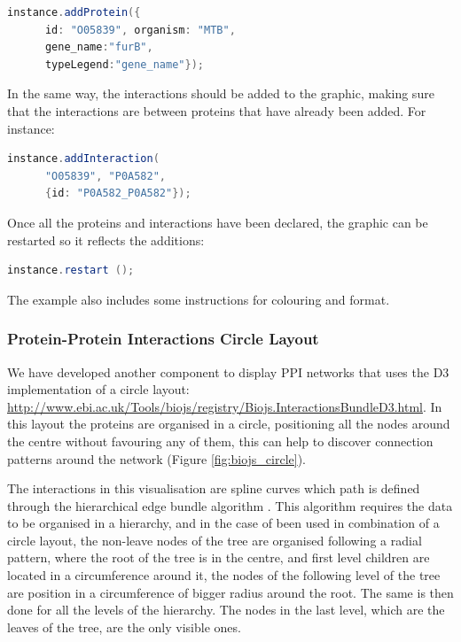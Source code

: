 \begin{lstlisting}[language=java]
instance.addProtein({
      id: "O05839", organism: "MTB",
      gene_name:"furB",
      typeLegend:"gene_name"});
\end{lstlisting}
					
In the same way, the interactions should be added to the graphic, making sure that the interactions are between proteins that have already been added. For instance:

\begin{lstlisting}[language=java]
instance.addInteraction(
      "O05839", "P0A582",
      {id: "P0A582_P0A582"}); 
\end{lstlisting}
					
Once all the proteins and interactions have been declared, the graphic can be restarted so it reflects the additions:

\begin{lstlisting}[language=java]
instance.restart ();
\end{lstlisting}

The example also includes some instructions for colouring and format. 


\subsubsection{Protein-Protein Interactions Circle Layout} \label{subsubsec:ppi2_biojs}
We have developed another component to display PPI networks that uses the D3 implementation of a circle layout: \url{http://www.ebi.ac.uk/Tools/biojs/registry/Biojs.InteractionsBundleD3.html}. In this layout the proteins are organised in a circle, positioning all the nodes around the centre without favouring any of them, this can help to discover connection patterns around the network (Figure \ref{fig:biojs_circle}). 

The interactions in this visualisation are spline curves which path is defined through the hierarchical edge bundle algorithm \cite{HOL2006}. This algorithm requires the data to be organised in a hierarchy, and in the case of been used in combination of a circle layout, the non-leave nodes of the tree are organised following a radial pattern, where the root of the tree is in the centre, and first level children are located in a circumference around it, the nodes of the following level of the tree are position in a circumference of bigger radius around the root. The same is then done for all the levels of the hierarchy. The nodes in the last level, which are the leaves of the tree, are the only visible ones.

